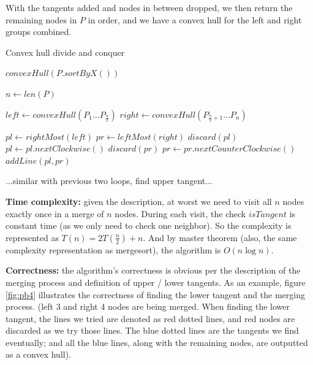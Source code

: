 \documentclass{article}
\begin{document}
\begin{description}
  With the tangents added and nodes in between dropped, we then return the remaining nodes in $P$ in order, and we have a convex hull for the left and right groups combined.

  \begin{algorithm}[H]
  \caption{Convex hull divide and conquer}
  \label{alg:convex-hull-divide and conquer}
    \begin{algorithmic}[1]
    
      \State $convexHull(P.sortByX())$
    \EndFunction

      \State $n \gets len(P)$
      \label{line:start1}
        \State {}
      \EndIf
      
      \State $left \gets convexHull(P_1...P_{\frac{n}{2}})$
      \State $right \gets convexHull(P_{\frac{n}{2} + 1}...P_n)$
      \label{line:end1}

      \State $pl \gets rightMost(left)$
      \label{line:start2}
      \State $pr \gets leftMost(right)$
        \State $discard(pl)$
        \State $pl \gets pl.nextClockwise()$
      \EndWhile
        \State $discard(pr)$
        \State $pr \gets pr.nextCounterClockwise()$
      \EndWhile
      \State $addLine(pl, pr)$ 
      \label{line:end2}

      \State
      \label{line:start3}
      \State ...similar with previous two loops, find upper tangent...
      \EndWhile
      \label{line:end3}
      \State

      \State {}

    \EndFunction

    \end{algorithmic}
  \end{algorithm}

  \textbf{Time complexity:} given the description, at worst we need to visit all $n$ nodes exactly once in a merge of $n$ nodes. During each visit, the check $isTangent$ is constant time (as we only need to check one neighbor). So the complexity is represented as $T(n) = 2T(\frac{n}{2}) + n$. And by master theorem (also, the same complexity representation as mergesort), the algorithm is $O(n \log n)$.

  \textbf{Correctness:} the algorithm's correctness is obvious per the description of the merging process and definition of upper / lower tangents. As an example, figure \ref{fig:pb4} illustrates the correctness of finding the lower tangent and the merging process. (left 3 and right 4 nodes are being merged. When finding the lower tangent, the lines we tried are denoted as red dotted lines, and red nodes are discarded as we try those lines. The blue dotted lines are the tangents we find eventually; and all the blue lines, along with the remaining nodes, are outputted as a convex hull).


\end{description}
\end{document}
